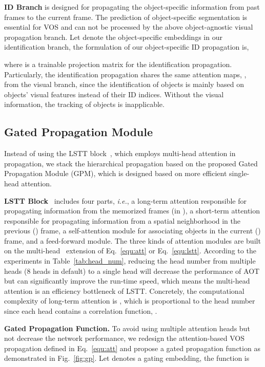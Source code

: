 \documentclass{article}
\def\ie{\emph{i.e.}}
\begin{document}
\noindent\textbf{ID Branch} is designed for propagating the object-specific information from past frames to the current frame. The prediction of object-specific segmentation is essential for VOS and can not be processed by the above object-agnostic visual propagation branch. Let  denote the object-specific embeddings in our identification branch, the formulation of our object-specific ID propagation is,

where  is a trainable projection matrix for the identification propagation. Particularly, the identification propagation shares the same attention maps, , from the visual branch, since the identification of objects is mainly based on objects' visual features instead of their ID indices. Without the visual information, the tracking of objects is inapplicable.

\subsection{Gated Propagation Module}
Instead of using the LSTT block~\cite{aot}, which employs multi-head attention in propagation, we stack the hierarchical propagation based on the proposed Gated Propagation Module (GPM), which is designed based on more efficient single-head attention. 

\noindent\textbf{LSTT Block}~\cite{aot} includes four parts, \ie, a long-term attention responsible for propagating information from the memorized frames (in ), a short-term attention responsible for propagating information from a spatial neighborhood in the previous () frame, a self-attention module for associating objects in the current () frame, and a feed-forward module. The three kinds of attention modules are built on the multi-head~\cite{transformer} extension of Eq.~\ref{equ:att} or Eq.~\ref{equ:lstt}. According to the experiments in Table~\ref{tab:head_num}, reducing the head number from multiple heads (8 heads in default) to a single head will decrease the performance of AOT but can significantly improve the run-time speed, which means the multi-head attention is an efficiency bottleneck of LSTT. Concretely, the computational complexity of long-term attention is , which is proportional to the head number  since each head contains a correlation function, . 

\noindent\textbf{Gated Propagation Function.} To avoid using multiple attention heads but not decrease the network performance, we redesign the attention-based VOS propagation defined in Eq.~\ref{equ:att} and propose a gated propagation function as demonstrated in Fig.~\ref{fig:gp}. Let  denotes a gating embedding, the function is
\end{document}
